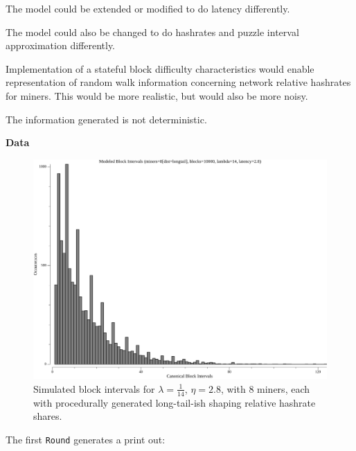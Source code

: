 \documentclass[11pt]{article}
\theoremstyle{plain}
\begin{document}
The model could be extended or modified to do latency differently.

The model could also be changed to do hashrates and puzzle interval
approximation differently.

Implementation of a stateful block difficulty characteristics would enable
representation of random walk information concerning network relative hashrates
for miners. This would be more realistic, but would also be more noisy.



The information generated is not deterministic.

\textbf{Data}


\begin{figure}[tph]
    \centering
\includegraphics[width=1.0\textwidth]{go-poisson_A0_blockIntervals.png}
    \caption{
      Simulated block intervals for $\lambda=\frac{1}{14}$, $\eta=2.8$, with
      $8$ miners, each with procedurally generated long-tail-ish shaping
      relative hashrate shares.
    }
\end{figure}

\pagebreak

The first \texttt{Round} generates a print out:
\end{document}
